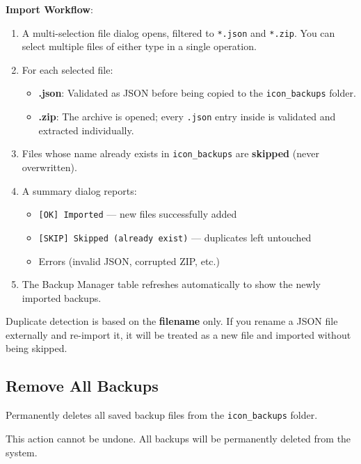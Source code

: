 \documentclass[a4paper,11pt]{article}
\begin{document}
\textbf{Import Workflow}:
\begin{enumerate}
  \item A multi-selection file dialog opens, filtered to
    \texttt{*.json} and \texttt{*.zip}.
    You can select multiple files of either type in a single operation.
  \item For each selected file:
    \begin{itemize}
      \item \textbf{.json}: Validated as JSON before being copied to the
        \texttt{icon\_backups} folder.
      \item \textbf{.zip}: The archive is opened; every \texttt{.json}
        entry inside is validated and extracted individually.
    \end{itemize}
  \item Files whose name already exists in \texttt{icon\_backups} are
    \textbf{skipped} (never overwritten).
  \item A summary dialog reports:
    \begin{itemize}
      \item \texttt{[OK] Imported} --- new files successfully added
      \item \texttt{[SKIP] Skipped (already exist)} --- duplicates
        left untouched
      \item Errors (invalid JSON, corrupted ZIP, etc.)
    \end{itemize}
  \item The Backup Manager table refreshes automatically to show the
    newly imported backups.
\end{enumerate}

\begin{warningbox}
  Duplicate detection is based on the \textbf{filename} only.
  If you rename a JSON file externally and re-import it, it will be
  treated as a new file and imported without being skipped.
\end{warningbox}

\subsection{Remove All Backups}

Permanently deletes all saved backup files from the
\texttt{icon\_backups} folder.

\begin{warningbox}
  This action cannot be undone. All backups will be permanently
  deleted from the system.
\end{warningbox}
\end{document}
